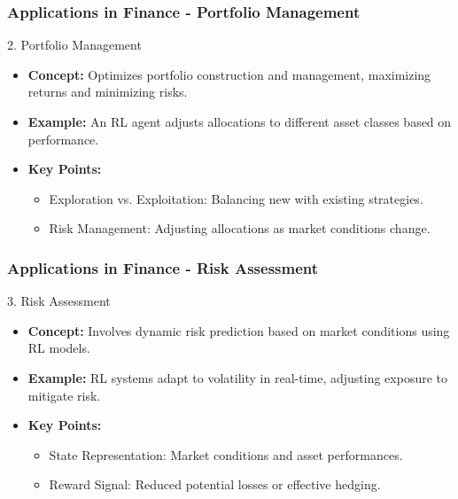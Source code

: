 \documentclass{beamer}
\begin{document}
\begin{frame}[fragile]
    \frametitle{Applications in Finance - Portfolio Management}
    \begin{block}{2. Portfolio Management}
        \begin{itemize}
            \item \textbf{Concept:} Optimizes portfolio construction and management, maximizing returns and minimizing risks.
            \item \textbf{Example:} An RL agent adjusts allocations to different asset classes based on performance.
        \end{itemize}
        \begin{itemize}
            \item \textbf{Key Points:}
            \begin{itemize}
                \item Exploration vs. Exploitation: Balancing new with existing strategies.
                \item Risk Management: Adjusting allocations as market conditions change.
            \end{itemize}
        \end{itemize}
    \end{block}
\end{frame}

\begin{frame}[fragile]
    \frametitle{Applications in Finance - Risk Assessment}
    \begin{block}{3. Risk Assessment}
        \begin{itemize}
            \item \textbf{Concept:} Involves dynamic risk prediction based on market conditions using RL models.
            \item \textbf{Example:} RL systems adapt to volatility in real-time, adjusting exposure to mitigate risk.
        \end{itemize}
        \begin{itemize}
            \item \textbf{Key Points:}
            \begin{itemize}
                \item State Representation: Market conditions and asset performances.
                \item Reward Signal: Reduced potential losses or effective hedging.
            \end{itemize}
        \end{itemize}
    \end{block}
\end{frame}
\end{document}
